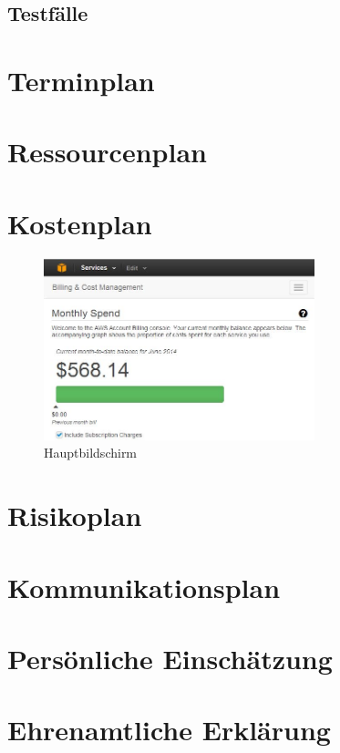 \documentclass{article}
\begin{document}
\subsection{Testfälle}

\section{Terminplan}

\section{Ressourcenplan}

\section{Kostenplan}

\begin{figure}[H]
    \centering
    \includegraphics[width=0.7\textwidth]{images/amazon-bill.jpg}
    \caption{Hauptbildschirm}
    \label{fig:overview}
\end{figure}

\section{Risikoplan}

\section{Kommunikationsplan}

\section{Persönliche Einschätzung}

\section{Ehrenamtliche Erklärung}
\end{document}
